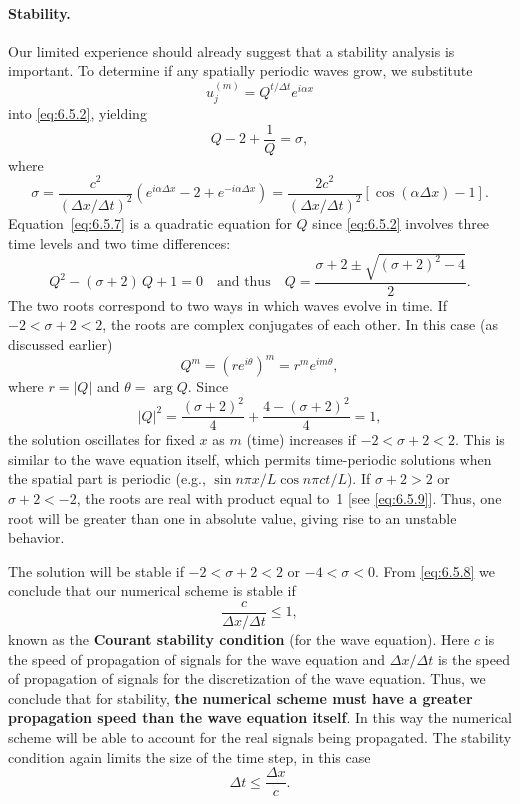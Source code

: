 \paragraph{Stability.}
Our limited experience should already suggest that a stability analysis is important.  To determine if any spatially periodic waves grow, we substitute
\begin{equation}
u_j^{(m)} = Q^{t/\Delta t}e^{i\alpha x}
\label{eq:6.5.6}
\end{equation}
into \eqref{eq:6.5.2}, yielding
\begin{equation}
Q - 2 + \frac{1}{Q} = \sigma,
\label{eq:6.5.7}
\end{equation}
where
\begin{equation}
\sigma = \frac{c^2}{(\Delta x/\Delta t)^2}\left(e^{i\alpha\Delta x} - 2 + e^{-i\alpha\Delta x}\right) = \frac{2c^2}{(\Delta x/\Delta t)^2}\left[\cos(\alpha\Delta x) - 1\right].
\label{eq:6.5.8}
\end{equation}
Equation~\eqref{eq:6.5.7} is a quadratic equation for $Q$ since \eqref{eq:6.5.2} involves three time levels and two time differences:
\begin{equation}
Q^2 - (\sigma + 2)\,Q + 1 = 0 \quad\text{and thus}\quad Q = \frac{\sigma + 2 \pm \sqrt{(\sigma+2)^2 - 4}}{2}.
\label{eq:6.5.9}
\end{equation}
The two roots correspond to two ways in which waves evolve in time.  If $-2 < \sigma + 2 < 2$, the roots are complex conjugates of each other.  In this case (as discussed earlier)
\[
Q^m = (re^{i\theta})^m = r^m e^{im\theta},
\]
where $r = |Q|$ and $\theta = \arg Q$.  Since
\[
|Q|^2 = \frac{(\sigma + 2)^2}{4} + \frac{4 - (\sigma+2)^2}{4} = 1,
\]
the solution oscillates for fixed $x$ as $m$ (time) increases if $-2 < \sigma + 2 < 2$.  This is similar to the wave equation itself, which permits time-periodic solutions when the spatial part is periodic (e.g., $\sin n\pi x/L\cos n\pi ct/L$).  If $\sigma + 2 > 2$ or $\sigma + 2 < -2$, the roots are real with product equal to~1 [see \eqref{eq:6.5.9}].  Thus, one root will be greater than one in absolute value, giving rise to an unstable behavior.

The solution will be stable if $-2 < \sigma + 2 < 2$ or $-4 < \sigma < 0$.  From \eqref{eq:6.5.8} we conclude that our numerical scheme is stable if
\begin{equation}
\boxed{\frac{c}{\Delta x/\Delta t} \le 1,}
\label{eq:6.5.10}
\end{equation}
known as the \textbf{Courant stability condition} (for the wave equation).  Here $c$ is the speed of propagation of signals for the wave equation and $\Delta x/\Delta t$ is the speed of propagation of signals for the discretization of the wave equation.  Thus, we conclude that for stability, \textbf{the numerical scheme must have a greater propagation speed than the wave equation itself}.  In this way the numerical scheme will be able to account for the real signals being propagated.  The stability condition again limits the size of the time step, in this case
\begin{equation}
\Delta t \le \frac{\Delta x}{c}.
\label{eq:6.5.11}
\end{equation}

